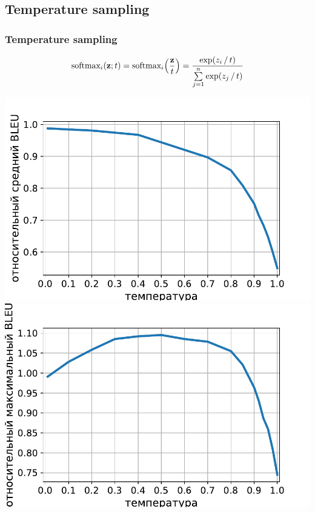 \documentclass[unicode]{beamer}
\begin{document}
\subsection{Temperature sampling}
\begin{frame}
\frametitle{Temperature sampling}
$$\textrm{softmax}_i(\bold{z}; t) = \textrm{softmax}_i \Big( \frac{\bold{z}}{t} \Big) = \frac{\exp(z_i \, / \, t)}{\sum\limits_{j=1}^n \exp(z_j \, / \, t)}$$
    \begin{center}
        \includegraphics[scale=0.25]{avg-bleu-temperature-sampling.pdf}
        \includegraphics[scale=0.25]{max-bleu-temperature-sampling.pdf}
    \end{center}


\end{frame}
\end{document}

